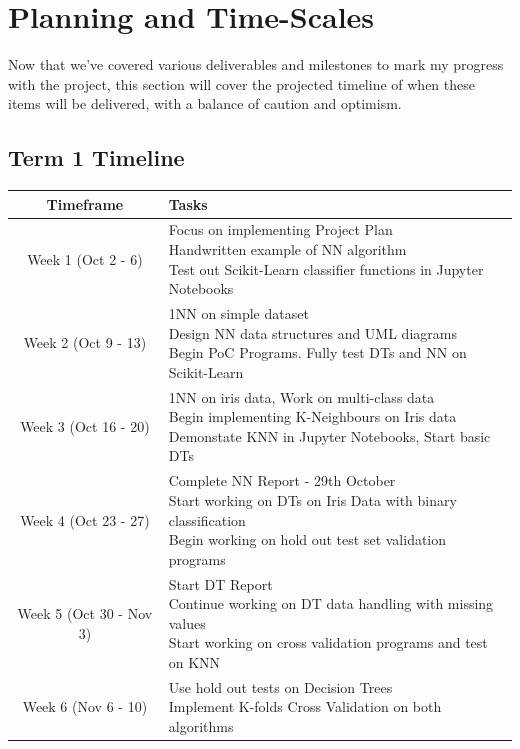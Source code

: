 \documentclass[report,10pt]{article}
\begin{document}
\section{Planning and Time-Scales}
Now that we've covered various deliverables and milestones to mark my progress with the project, this section will cover the projected timeline of when these items will be delivered, with a balance of caution and optimism. \par
\vspace{10mm}
\subsection{Term 1 Timeline}
\begin{tabular}{|c|p{10cm}|}
\hline
Timeframe & Tasks \\
\hline
Week 1 (Oct 2 - 6) & 
\makecell[l]{Focus on implementing Project Plan \\
Handwritten example of NN algorithm \\
Test out Scikit-Learn classifier functions in Jupyter Notebooks } \\
\hline
Week 2 (Oct 9 - 13) & 
\makecell[l]{1NN on simple dataset \\
Design NN data structures and UML diagrams \\
Begin PoC Programs. Fully test DTs and NN on Scikit-Learn} \\
\hline
Week 3 (Oct 16 - 20) & 
\makecell[l]{1NN on iris data, Work on multi-class data \\
Begin implementing K-Neighbours on Iris data \\
Demonstate KNN in Jupyter Notebooks, Start basic DTs} \\
\hline
Week 4 (Oct 23 - 27) & 
\makecell[l]{Complete NN Report - 29th October \\
Start working on DTs on Iris Data with binary classification \\
Begin working on hold out test set validation programs} \\
\hline
Week 5 (Oct 30 - Nov 3) & 
\makecell[l]{Start DT Report \\
Continue working on DT data handling with missing values \\
Start working on cross validation programs and test on KNN} \\
\hline
Week 6 (Nov 6 - 10) & 
\makecell[l]{Use hold out tests on Decision Trees \\
 Implement K-folds Cross Validation on both algorithms \\
}
\end{tabular}
\end{document}
